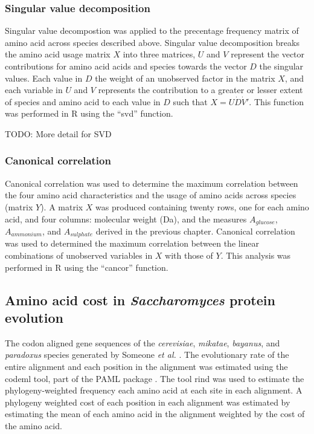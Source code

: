 \subsubsection{Singular value decomposition}
 
Singular value decompostion was applied to the precentage frequency matrix of amino acid across species described above. Singular value decomposition breaks the amino acid usage matrix $X$ into three matrices, $U$ and $V$ represent the vector contributions for amino acid acids and species towards the vector $D$ the singular values. Each value in $D$ the weight of an unobserved factor in the matrix $X$, and each variable in $U$ and $V$  represents the contribution to a greater or lesser extent of species and amino acid to each value in $D$ such that $X = U \dot D \dot V'$. This function was performed in R using the ``svd'' function.

TODO: More detail for SVD

\subsubsection{Canonical correlation}

Canonical correlation was used to determine the maximum correlation between the four amino acid characteristics and the usage of amino acids across species (matrix $Y$). A matrix $X$ was produced containing twenty rows, one for each amino acid, and four columns: molecular weight (Da), and the measures $A_{glucose}$, $A_{ammonium}$, and $A_{sulphate}$ derived in the previous chapter. Canonical correlation was used to determined the maximum correlation between the linear combinations of unobserved variables in $X$ with those of $Y$. This analysis was performed in R using the ``cancor'' function.

\subsection{Amino acid cost in \emph{Saccharomyces} protein evolution}

The codon aligned gene sequences of the \emph{cerevisiae}, \emph{mikatae}, \emph{bayanus}, and \emph{paradoxus} species generated by Someone \emph{et al.} \cite{alignments}. The evolutionary rate of the entire alignment and each position in the alignment was estimated using the codeml tool, part of the PAML package \cite{paml}. The tool rind \cite{rind} was used to estimate the phylogeny-weighted frequency each amino acid at each site in each alignment. A phylogeny weighted cost of each position in each alignment was estimated by estimating the mean of each amino acid in the alignment weighted by the cost of the amino acid.


